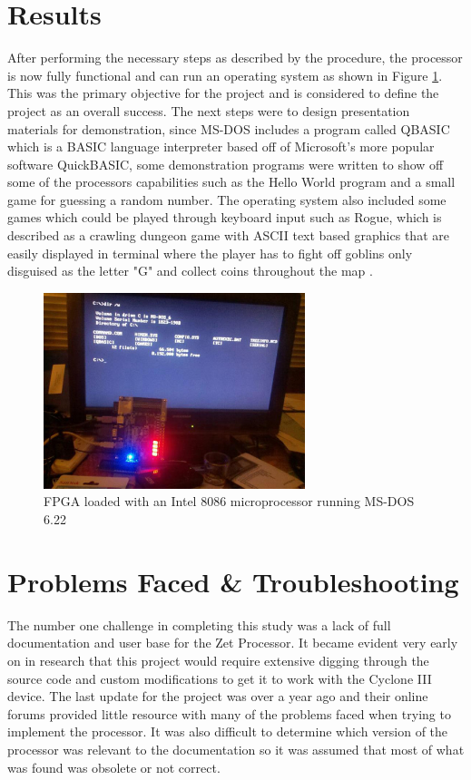 \documentclass[11pt,peerreview, onecolumn]{IEEEtran}
\begin{document}
\section{Results}
After performing the necessary steps as described by the procedure, the processor is now fully functional and can run an operating system as shown in Figure \ref{fig:WorkingFPGA}. This was the primary objective for the project and is considered to define the project as an overall success. The next steps were to design presentation materials for demonstration, since MS-DOS includes a program called QBASIC which is a BASIC language interpreter based off of Microsoft's more popular software QuickBASIC, some demonstration programs were written to show off some of the processors capabilities such as the Hello World program and a small game for guessing a random number. The operating system also included some games which could be played through keyboard input such as Rogue, which is described as a crawling dungeon game with ASCII text based graphics that are easily displayed in terminal where the player has to fight off goblins only disguised as the letter "G" and collect coins throughout the map \cite{Rogue}. 

\begin{figure}[!h]
\centering
\includegraphics[width=3in]{fpgaworking}
\caption{FPGA loaded with an Intel 8086 microprocessor running MS-DOS 6.22}
\label{fig:WorkingFPGA}
\end{figure}

\section{Problems Faced \& Troubleshooting}
The number one challenge in completing this study was a lack of full documentation and user base for the Zet Processor. It became evident very early on in research that this project would require extensive digging through the source code and custom modifications to get it to work with the Cyclone III device. The last update for the project was over a year ago and their online forums provided little resource with many of the problems faced when trying to implement the processor. It was also difficult to determine which version of the processor was relevant to the documentation so it was assumed that most of what was found was obsolete or not correct.
\end{document}
